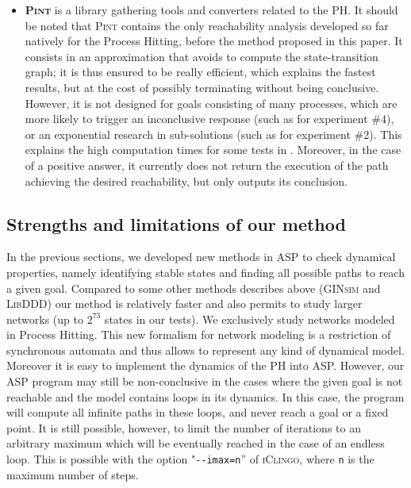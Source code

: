 \begin{itemize}
\item \textbf{\textsc{Pint}}
is a library gathering tools and converters related to the PH.
It should be noted that \textsc{Pint} contains the only reachability analysis
developed so far natively for the Process Hitting,
before the method proposed in this paper.
It consists in an approximation that avoids to compute the state-transition graph;
it is thus ensured to be really efficient, which explains the fastest results,
but at the cost of possibly terminating without being conclusive.
However, it is not designed for goals consisting of many processes,
which are more likely to trigger an inconclusive response
(such as for experiment \#4),
or an exponential research in sub-solutions
(such as for experiment \#2).
This explains the high computation times for some tests in .
Moreover, in the case of a positive answer,
it currently does not return the execution of the path achieving the desired reachability,
but only outputs its conclusion.
\end{itemize}

\subsection{Strengths and limitations of our method}
\label{sec:limitations}

In the previous sections,
we developed new methods in ASP to check dynamical properties,
namely identifying stable states and finding all possible paths to reach a given goal.
Compared to some other methods describes above
(\textsc{GINsim} and \textsc{LibDDD}) our method is relatively faster and also permits to study larger networks
(up to $2^{73}$ states in our tests). We exclusively study networks modeled in Process Hitting. This new formalism for network modeling is a restriction of synchronous automata and thus allows to represent any kind of dynamical model. Moreover it is easy to implement the dynamics of the PH into ASP.
However, our ASP program may still be non-conclusive
in the cases where the given goal is not
reachable and the model contains loops in its dynamics.
In this case, the program will compute all infinite paths in these loops,
and never reach a goal or a fixed point.
It is still possible, however, to limit the number of iterations to an arbitrary
maximum which will be eventually reached in the case of an endless loop.
This is possible with the option "\texttt{-{}-imax=n}'' of \textsc{iClingo},
where \texttt{n} is the maximum number of steps.

